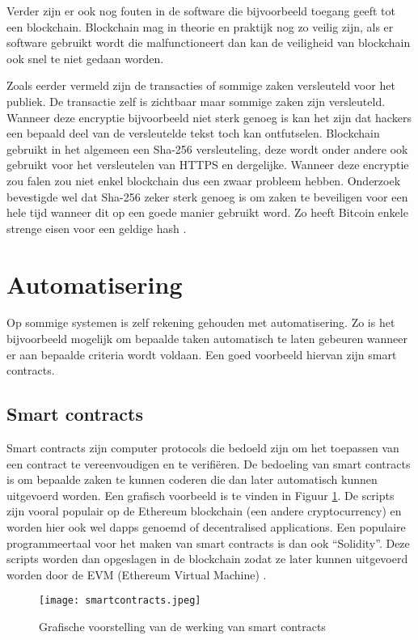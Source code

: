 Verder zijn er ook nog fouten in de software die bijvoorbeeld toegang geeft tot een blockchain. Blockchain mag in theorie en praktijk nog zo veilig zijn, als er software gebruikt wordt die malfunctioneert dan kan de veiligheid van blockchain ook snel te niet gedaan worden.

Zoals eerder vermeld zijn de transacties of sommige zaken versleuteld voor het publiek. De transactie zelf is zichtbaar maar sommige zaken zijn versleuteld. Wanneer deze encryptie bijvoorbeeld niet sterk genoeg is kan het zijn dat hackers een bepaald deel van de versleutelde tekst toch kan ontfutselen. Blockchain gebruikt in het algemeen een Sha-256 versleuteling, deze wordt onder andere ook gebruikt voor het versleutelen van HTTPS en dergelijke. Wanneer deze encryptie zou falen zou niet enkel blockchain dus een zwaar probleem hebben. Onderzoek bevestigde wel dat Sha-256 zeker sterk genoeg is om zaken te beveiligen voor een hele tijd wanneer dit op een goede manier gebruikt word. Zo heeft Bitcoin enkele strenge eisen voor een geldige hash \textcite{Faife2017}.

\section{Automatisering}
Op sommige systemen is zelf rekening gehouden met automatisering. Zo is het bijvoorbeeld mogelijk om bepaalde taken automatisch te laten gebeuren wanneer er aan bepaalde criteria wordt voldaan. Een goed voorbeeld hiervan zijn smart contracts.

\subsection{Smart contracts}
Smart contracts zijn computer protocols die bedoeld zijn om het toepassen van een contract te vereenvoudigen en te verifiëren. De bedoeling van smart contracts is om bepaalde zaken te kunnen coderen die dan later automatisch kunnen uitgevoerd worden. Een grafisch voorbeeld is te vinden in Figuur \ref{fig:smartcontracts}. De scripts zijn vooral populair op de Ethereum blockchain (een andere cryptocurrency) en worden hier ook wel dapps genoemd of decentralised applications. Een populaire programmeertaal voor het maken van smart contracts is dan ook ``Solidity''. Deze scripts worden dan opgeslagen in de blockchain zodat ze later kunnen uitgevoerd worden door de EVM (Ethereum Virtual Machine)  \textcite{Chandrayan2017}.

\begin{figure}
	\texttt{[image: smartcontracts.jpeg]}
	\caption{Grafische voorstelling van de werking van smart contracts  \textcite{Itweb}}
	\label{fig:smartcontracts}
\end{figure}

